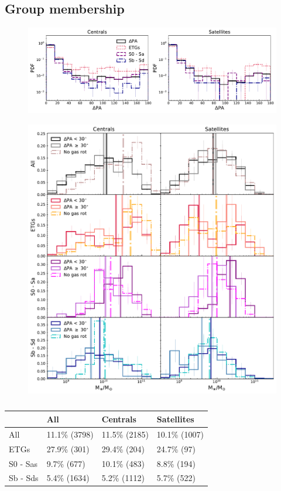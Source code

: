 \documentclass[fleqn,usenatbib]{mnras}
\begin{document}
\subsection{Group membership}

\begin{figure}
	\includegraphics[width=\linewidth]{cen_sat/delPA_morph_lim.pdf}
    \caption{}
    \label{fig:group_morph_PA}
\end{figure}

\begin{figure}
	\includegraphics[width=\linewidth]{cen_sat/delPA_stelM_morph_lim.pdf}
    \caption{}
    \label{fig:group_morph_stelM}
\end{figure}

\begin{table}
\begin{tabular}{llll}
\hline
          &           All &      Centrals &    Satellites \\
\hline
      All &  11.1\% (3798) &  11.5\% (2185) &  10.1\% (1007) \\
     ETGs &   27.9\% (301) &   29.4\% (204) &    24.7\% (97) \\
 S0 - Sas &    9.7\% (677) &   10.1\% (483) &    8.8\% (194) \\
 Sb - Sds &   5.4\% (1634) &   5.2\% (1112) &    5.7\% (522) \\
\end{tabular}
\caption{}
\label{tab:mega_table}
\end{table}
\end{document}
